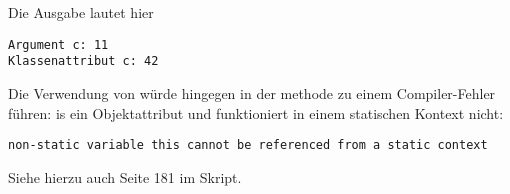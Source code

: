 Die Ausgabe lautet hier

\begin{lstlisting}[language=text]
Argument c: 11
Klassenattribut c: 42
\end{lstlisting}

Die Verwendung von  würde hingegen in der methode  zu einem Compiler-Fehler führen:  is ein
Objektattribut und funktioniert in einem statischen Kontext nicht:

\begin{lstlisting}[language=text]
non-static variable this cannot be referenced from a static context
\end{lstlisting}

Siehe hierzu auch Seite 181 im Skript.


